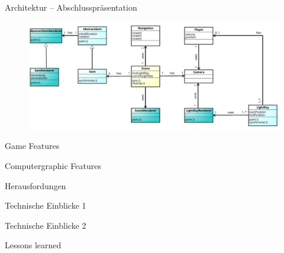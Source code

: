 \begin{frame}{Architektur -- Abschlusspräsentation}
	\begin{figure}
		\centering
		\includegraphics[width=\textwidth, height=\textheight, keepaspectratio]{images/klassendiagramm}
	\end{figure}
\end{frame}

\begin{frame}{Game Features}

\end{frame}

\begin{frame}{Computergraphic Features}

\end{frame}

\begin{frame}{Herausfordungen}

\end{frame}

\begin{frame}{Technische Einblicke 1}

\end{frame}

\begin{frame}{Technische Einblicke 2}

\end{frame}

\begin{frame}{Lessons learned}

\end{frame}

%


